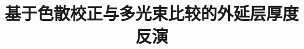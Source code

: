 \documentclass[withoutpreface,bwprint]{cumcmthesis}
\title{基于色散校正与多光束比较的外延层厚度反演}
\author{}
\date{}
\numberwithin{equation}{section}
\renewcommand{\theequation}{\arabic{section}.\arabic{equation}}
\renewcommand{\thefigure}{\arabic{section}-\arabic{figure}}
\renewcommand{\thetable}{\arabic{section}-\arabic{table}}
\begin{document}
\maketitle











\begin{appendices}
\renewcommand{\theequation}{\Alph{section}.\arabic{equation}}
\renewcommand{\thefigure}{\Alph{section}-\arabic{figure}}
\renewcommand{\thetable}{\Alph{section}-\arabic{table}}

\end{appendices}
\end{document}
